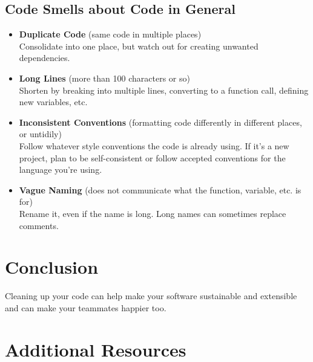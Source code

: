 \subsection{Code Smells about Code in General}

\begin{itemize}
\item{\textbf{Duplicate Code} (same code in multiple places)\\Consolidate into one place, but watch out for creating unwanted dependencies.
\spacer}
\item{\textbf{Long Lines} (more than 100 characters or so)\\Shorten by breaking into multiple lines, converting to a function call, defining new variables, etc.
\spacer}
\item{\textbf{Inconsistent Conventions} (formatting code differently in different places, or untidily)\\Follow whatever style conventions the code is already using. If it's a new project, plan to be self-consistent or follow accepted conventions for the language you're using.
\spacer}
\item{\textbf{Vague Naming} (does not communicate what the function, variable, etc. is for)\\Rename it, even if the name is long. Long names can sometimes replace comments.
\spacer
}
\end{itemize}

\nomargins
\section{Conclusion}
Cleaning up your code can help make your software sustainable and extensible and can make your teammates happier too.

\section{Additional Resources}

\begin{description}
\item {}
\item {}
\item {}
\end{description}